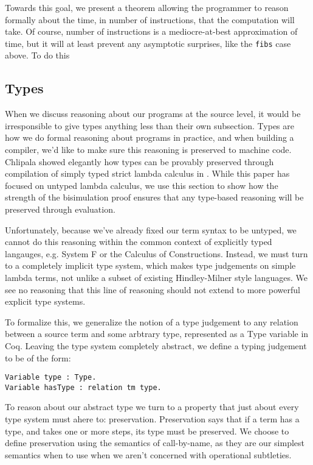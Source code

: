 Towards this goal, we present a theorem allowing the programmer to reason
formally about the time, in number of instructions, that the computation will
take. Of course, number of instructions is a mediocre-at-best approximation of
time, but it will at least prevent any asymptotic surprises, like the
\texttt{fibs} case above. To do this

\subsection{Types}

When we discuss reasoning about our programs at the source level, it would be
irresponsible to give types anything less than their own subsection. Types are
how we do formal reasoning about programs in practice, and when building a
compiler, we'd like to make sure this reasoning is preserved to machine code.
Chlipala showed elegantly how types can be provably preserved through
compilation of simply typed strict lambda calculus in \cite{?}. While this paper
has focused on untyped lambda calculus, we use this section to show how the
strength of the bisimulation proof ensures that any type-based reasoning will be
preserved through evaluation.  

Unfortunately, because we've already fixed our term syntax to be untyped, we
cannot do this reasoning within the common context of explicitly typed
langauges, e.g. System F or the Calculus of Constructions. Instead, we must turn
to a completely implicit type system, which makes type judgements on simple
lambda terms, not unlike a subset of existing Hindley-Milner style languages. We
see no reasoning that this line of reasoning should not extend to more powerful
explicit type systems. 

To formalize this, we generalize the notion of a type judgement to any relation
between a source term and some arbtrary type, represented as a Type variable in
Coq. Leaving the type system completely abstract, we define a typing judgement
to be of the form:

\begin{lstlisting}
Variable type : Type.
Variable hasType : relation tm type.
\end{lstlisting}

To reason about our abstract type we turn to a property that just about every
type system must ahere to: preservation. Preservation says that if a term has a
type, and takes one or more steps, its type must be preserved. We choose to
define preservation using the semantics of call-by-name, as they are our
simplest semantics when to use when we aren't concerned with operational
subtleties.

